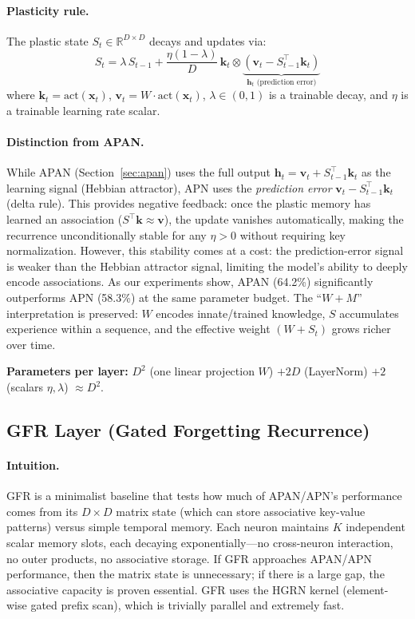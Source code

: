 \documentclass[11pt,a4paper]{article}
\begin{document}
\paragraph{Plasticity rule.}
The plastic state $S_t \in \mathbb{R}^{D \times D}$ decays and updates via:
\begin{equation}\label{eq:apn-update}
S_t = \lambda \, S_{t-1} + \frac{\eta(1-\lambda)}{D} \, \mathbf{k}_t \otimes \underbrace{(\mathbf{v}_t - S_{t-1}^\top \mathbf{k}_t)}_{\mathbf{h}_t\text{ (prediction error)}}
\end{equation}
where $\mathbf{k}_t = \text{act}(\mathbf{x}_t)$, $\mathbf{v}_t = W \cdot \text{act}(\mathbf{x}_t)$, $\lambda \in (0,1)$ is a trainable decay, and $\eta$ is a trainable learning rate scalar.

\paragraph{Distinction from APAN.}
While APAN (Section~\ref{sec:apan}) uses the full output $\mathbf{h}_t = \mathbf{v}_t + S_{t-1}^\top \mathbf{k}_t$ as the learning signal (Hebbian attractor),
APN uses the \emph{prediction error} $\mathbf{v}_t - S_{t-1}^\top \mathbf{k}_t$ (delta rule).
This provides negative feedback: once the plastic memory has learned an association ($S^\top \mathbf{k} \approx \mathbf{v}$), the update vanishes automatically, making the recurrence unconditionally stable for any $\eta > 0$ without requiring key normalization.
However, this stability comes at a cost: the prediction-error signal is weaker than the Hebbian attractor signal, limiting the model's ability to deeply encode associations.
As our experiments show, APAN (64.2\%) significantly outperforms APN (58.3\%) at the same parameter budget.
The ``$W + M$'' interpretation is preserved: $W$ encodes innate/trained knowledge, $S$ accumulates experience within a sequence, and the effective weight $(W + S_t)$ grows richer over time.

\textbf{Parameters per layer:} $D^2$ (one linear projection $W$) $+ 2D$ (LayerNorm) $+ 2$ (scalars $\eta, \lambda$) $\approx D^2$.

\subsection{GFR Layer (Gated Forgetting Recurrence)}

\paragraph{Intuition.}
GFR is a minimalist baseline that tests how much of APAN/APN's performance comes from its $D \times D$ matrix state (which can store associative key-value patterns) versus simple temporal memory.
Each neuron maintains $K$ independent scalar memory slots, each decaying exponentially---no cross-neuron interaction, no outer products, no associative storage.
If GFR approaches APAN/APN performance, then the matrix state is unnecessary; if there is a large gap, the associative capacity is proven essential.
GFR uses the HGRN kernel (element-wise gated prefix scan), which is trivially parallel and extremely fast.
\end{document}
